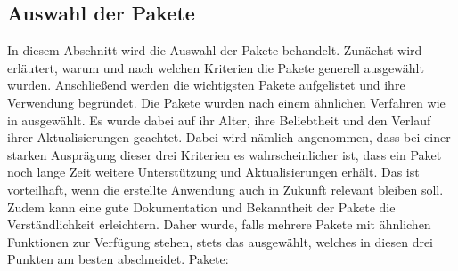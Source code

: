 \subsection{Auswahl der Pakete}\label{subsection:auswahlDerPakete}
In diesem Abschnitt wird die Auswahl der Pakete behandelt. Zunächst wird erläutert, warum und nach welchen Kriterien die Pakete generell ausgewählt wurden. Anschließend werden die wichtigsten Pakete aufgelistet und ihre Verwendung begründet.\newline%
	Die Pakete wurden nach einem ähnlichen Verfahren wie in  ausgewählt. Es wurde dabei auf ihr Alter, ihre Beliebtheit und den Verlauf ihrer Aktualisierungen geachtet. %
	Dabei wird nämlich angenommen, dass bei einer starken Ausprägung dieser drei Kriterien es wahrscheinlicher ist, dass ein Paket noch lange Zeit weitere Unterstützung und Aktualisierungen erhält. Das ist vorteilhaft, wenn die erstellte Anwendung auch in Zukunft relevant bleiben soll. %
	Zudem kann eine gute Dokumentation und Bekanntheit der Pakete die Verständlichkeit erleichtern. %
	Daher wurde, falls mehrere Pakete mit ähnlichen Funktionen zur Verfügung stehen, stets das ausgewählt, welches in diesen drei Punkten am besten abschneidet.%
%
\myNewSection
Pakete:
